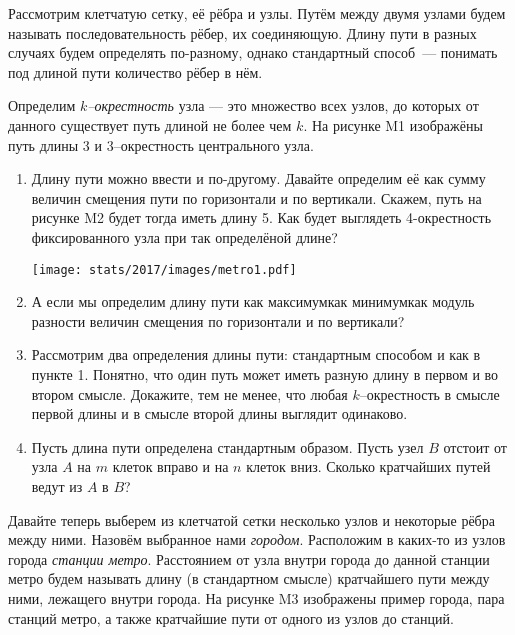 ﻿

\noindent Рассмотрим клетчатую сетку, её рёбра и узлы. Путём между двумя узлами будем называть последовательность рёбер, их соединяющую. Длину пути в разных случаях будем определять по-разному, однако стандартный способ~— понимать под длиной пути количество рёбер в нём.

\ms Определим {\itshape $k$--окрестность} узла — это множество всех узлов, до которых от данного существует путь длиной не более чем $k$. На рисунке M1 изображёны путь длины 3 и 3--окрестность центрального узла.

\begin{enumerate}

\item Длину пути можно ввести и по-другому. Давайте определим её как сумму величин смещения пути по горизонтали и по вертикали. Скажем, путь на рисунке M2 будет тогда иметь длину 5. Как будет выглядеть 4-окрестность фиксированного узла при так определёной длине?

\vspace{-0.3cm}
\begin{center}
\texttt{[image: stats/2017/images/metro1.pdf]}
\end{center} \vspace{-0.7cm}

\item А если мы определим длину пути как максимум\scolon как минимум\scolon как модуль разности величин смещения по горизонтали и по вертикали?

\item Рассмотрим два определения длины пути: стандартным способом и как в пункте 1. Понятно, что один путь может иметь разную длину в первом и во втором смысле. Докажите, тем не менее, что любая $k$--окрестность в смысле первой длины и в смысле второй длины выглядит одинаково.

\item Пусть длина пути определена стандартным образом. Пусть узел $B$ отстоит от узла $A$ на $m$ клеток вправо и на $n$ клеток вниз. Сколько кратчайших путей ведут из $A$ в $B$?

\end{enumerate}

\noindent Давайте теперь выберем из клетчатой сетки несколько узлов и некоторые рёбра между ними. Назовём выбранное нами {\itshape городом}. Расположим в каких-то из узлов города {\itshape станции метро}. Расстоянием от узла внутри города до данной станции метро будем называть длину (в стандартном смысле) кратчайшего пути между ними, лежащего внутри города. На рисунке M3 изображены пример города, пара станций метро, а также кратчайшие пути от одного из узлов до станций.

